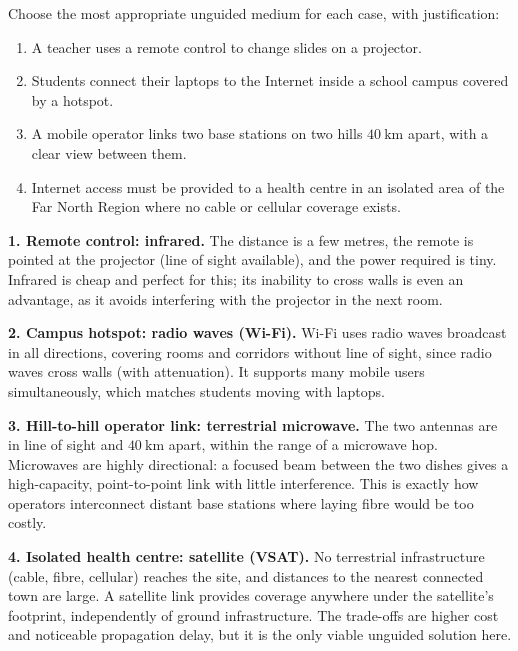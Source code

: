 \documentclass[11pt]{article}
\begin{document}
\begin{exoresolu}
Choose the most appropriate unguided medium for each case, with justification:
\begin{enumerate}
\item A teacher uses a remote control to change slides on a projector.
\item Students connect their laptops to the Internet inside a school campus covered by a hotspot.
\item A mobile operator links two base stations on two hills $40\ \mathrm{km}$ apart, with a clear view between them.
\item Internet access must be provided to a health centre in an isolated area of the Far North Region where no cable or cellular coverage exists.
\end{enumerate}
\tcblower
\textbf{1. Remote control: infrared.} The distance is a few metres, the remote is pointed at the projector (line of sight available), and the power required is tiny. Infrared is cheap and perfect for this; its inability to cross walls is even an advantage, as it avoids interfering with the projector in the next room.

\textbf{2. Campus hotspot: radio waves (Wi-Fi).} Wi-Fi uses radio waves broadcast in all directions, covering rooms and corridors without line of sight, since radio waves cross walls (with attenuation). It supports many mobile users simultaneously, which matches students moving with laptops.

\textbf{3. Hill-to-hill operator link: terrestrial microwave.} The two antennas are in line of sight and $40\ \mathrm{km}$ apart, within the range of a microwave hop. Microwaves are highly directional: a focused beam between the two dishes gives a high-capacity, point-to-point link with little interference. This is exactly how operators interconnect distant base stations where laying fibre would be too costly.

\textbf{4. Isolated health centre: satellite (VSAT).} No terrestrial infrastructure (cable, fibre, cellular) reaches the site, and distances to the nearest connected town are large. A satellite link provides coverage anywhere under the satellite's footprint, independently of ground infrastructure. The trade-offs are higher cost and noticeable propagation delay, but it is the only viable unguided solution here.


\end{exoresolu}
\end{document}
